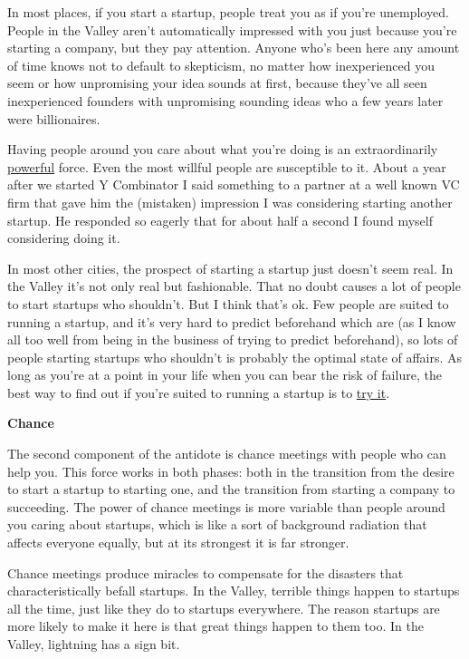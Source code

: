 In most places, if you start a startup, people treat you as if you're
unemployed. People in the Valley aren't automatically impressed with you
just because you're starting a company, but they pay attention. Anyone
who's been here any amount of time knows not to default to skepticism,
no matter how inexperienced you seem or how unpromising your idea sounds
at first, because they've all seen inexperienced founders with
unpromising sounding ideas who a few years later were billionaires.

Having people around you care about what you're doing is an
extraordinarily \href{cities.html}{powerful} force. Even the most
willful people are susceptible to it. About a year after we started Y
Combinator I said something to a partner at a well known VC firm that
gave him the (mistaken) impression I was considering starting another
startup. He responded so eagerly that for about half a second I found
myself considering doing it.

In most other cities, the prospect of starting a startup just doesn't
seem real. In the Valley it's not only real but fashionable. That no
doubt causes a lot of people to start startups who shouldn't. But I
think that's ok. Few people are suited to running a startup, and it's
very hard to predict beforehand which are (as I know all too well from
being in the business of trying to predict beforehand), so lots of
people starting startups who shouldn't is probably the optimal state of
affairs. As long as you're at a point in your life when you can bear the
risk of failure, the best way to find out if you're suited to running a
startup is to \href{notnot.html}{try it}.

\textbf{Chance}

The second component of the antidote is chance meetings with people who
can help you. This force works in both phases: both in the transition
from the desire to start a startup to starting one, and the transition
from starting a company to succeeding. The power of chance meetings is
more variable than people around you caring about startups, which is
like a sort of background radiation that affects everyone equally, but
at its strongest it is far stronger.

Chance meetings produce miracles to compensate for the disasters that
characteristically befall startups. In the Valley, terrible things
happen to startups all the time, just like they do to startups
everywhere. The reason startups are more likely to make it here is that
great things happen to them too. In the Valley, lightning has a sign
bit.

